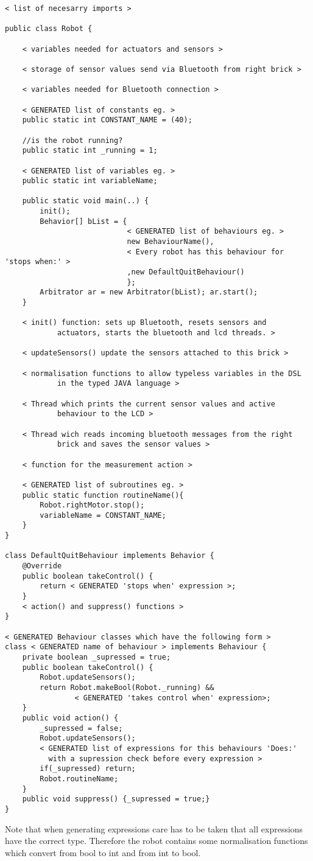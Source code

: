 \begin{lstlisting}
< list of necesarry imports >

public class Robot {

	< variables needed for actuators and sensors >

	< storage of sensor values send via Bluetooth from right brick >

	< variables needed for Bluetooth connection >

	< GENERATED list of constants eg. >
	public static int CONSTANT_NAME = (40);

	//is the robot running? 
	public static int _running = 1;

	< GENERATED list of variables eg. >
	public static int variableName;

	public static void main(..) {
		init();
		Behavior[] bList = {
							< GENERATED list of behaviours eg. >
							new BehaviourName(),
							< Every robot has this behaviour for 'stops when:' >
							,new DefaultQuitBehaviour() 
							};
		Arbitrator ar = new Arbitrator(bList); ar.start();
	}

	< init() function: sets up Bluetooth, resets sensors and 
			actuators, starts the bluetooth and lcd threads. >

	< updateSensors() update the sensors attached to this brick >

	< normalisation functions to allow typeless variables in the DSL
			in the typed JAVA language >

	< Thread which prints the current sensor values and active 
			behaviour to the LCD >

	< Thread wich reads incoming bluetooth messages from the right 
			brick and saves the sensor values >

	< function for the measurement action >

	< GENERATED list of subroutines eg. >
	public static function routineName(){
		Robot.rightMotor.stop();
		variableName = CONSTANT_NAME;
	}
}

class DefaultQuitBehaviour implements Behavior {	
	@Override
	public boolean takeControl() {
		return < GENERATED 'stops when' expression >;
	}
	< action() and suppress() functions >
}

< GENERATED Behaviour classes which have the following form >
class < GENERATED name of behaviour > implements Behaviour {
	private boolean _supressed = true;
	public boolean takeControl() {
		Robot.updateSensors();
		return Robot.makeBool(Robot._running) &&
				< GENERATED 'takes control when' expression>;
	}
	public void action() {
		_supressed = false;
		Robot.updateSensors();
		< GENERATED list of expressions for this behaviours 'Does:' 
		  with a supression check before every expression >
		if(_supressed) return;
		Robot.routineName;
	}
	public void suppress() {_supressed = true;}
}
\end{lstlisting}

Note that when generating expressions care has to be taken that all expressions
have the correct type. Therefore the robot contains some normalisation 
functions which convert from bool to int and from int to bool. 